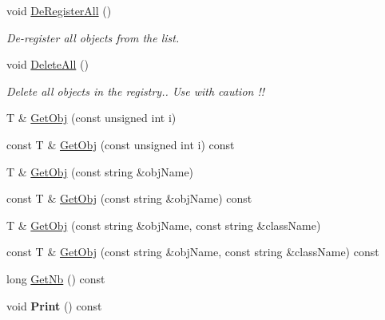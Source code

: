 \begin{DoxyCompactItemize}
\mbox{\label{class_obj_cryst_1_1_obj_registry_a2a379536cc636a8a1716720be7485e30}} 
void \mbox{\hyperlink{class_obj_cryst_1_1_obj_registry_a2a379536cc636a8a1716720be7485e30}{De\+Register\+All}} ()
\begin{DoxyCompactList}\small\item\em De-\/register {\itshape all} objects from the list. \end{DoxyCompactList}\item 
\mbox{\label{class_obj_cryst_1_1_obj_registry_adb16bd04fdeecf675d20c765e2b4d99f}} 
void \mbox{\hyperlink{class_obj_cryst_1_1_obj_registry_adb16bd04fdeecf675d20c765e2b4d99f}{Delete\+All}} ()
\begin{DoxyCompactList}\small\item\em Delete all objects in the registry.. Use with caution !! \end{DoxyCompactList}\item 
T \& \mbox{\hyperlink{class_obj_cryst_1_1_obj_registry_a48ac4ceb55051339b0fbd0dd4ba8d61a}{Get\+Obj}} (const unsigned int i)
\item 
const T \& \mbox{\hyperlink{class_obj_cryst_1_1_obj_registry_a9839646b3902eb9d57460bfcbb631d56}{Get\+Obj}} (const unsigned int i) const
\item 
T \& \mbox{\hyperlink{class_obj_cryst_1_1_obj_registry_addf46e1c23ead63e175f1168a7bf25c0}{Get\+Obj}} (const string \&obj\+Name)
\item 
const T \& \mbox{\hyperlink{class_obj_cryst_1_1_obj_registry_a56ca93ab655b513d91cd9b7829cbea0c}{Get\+Obj}} (const string \&obj\+Name) const
\item 
T \& \mbox{\hyperlink{class_obj_cryst_1_1_obj_registry_ad1971c0ea162546bf8322dc61764fd32}{Get\+Obj}} (const string \&obj\+Name, const string \&class\+Name)
\item 
const T \& \mbox{\hyperlink{class_obj_cryst_1_1_obj_registry_a1c6961905c0f6009b09dd6d79cabfbfa}{Get\+Obj}} (const string \&obj\+Name, const string \&class\+Name) const
\item 
long \mbox{\hyperlink{class_obj_cryst_1_1_obj_registry_a5bd48c843107f24355d42ab857979744}{Get\+Nb}} () const
\item 
\mbox{\label{class_obj_cryst_1_1_obj_registry_ab4528fb4b04e7c2d3fdacbc0d87e696a}} 
void {\bfseries Print} () const
\item 

\end{DoxyCompactItemize}
